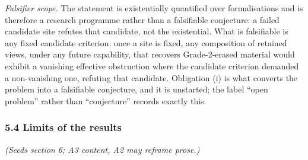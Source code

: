 \documentclass[
  11pt,
]{article}
\begin{document}
\emph{Falsifier scope.} The statement is existentially quantified over
formalisations and is therefore a research programme rather than a
falsifiable conjecture: a failed candidate site refutes that candidate,
not the existential. What is falsifiable is any fixed candidate
criterion: once a site is fixed, any composition of retained views,
under any future capability, that recovers Grade-2-erased material would
exhibit a vanishing effective obstruction where the candidate criterion
demanded a non-vanishing one, refuting that candidate. Obligation (i) is
what converts the problem into a falsifiable conjecture, and it is
unstarted; the label ``open problem'' rather than ``conjecture'' records
exactly this.

\subsubsection{5.4 Limits of the results}\label{limits-of-the-results}

\emph{(Seeds section 6; A3 content, A2 may reframe prose.)}
\end{document}
